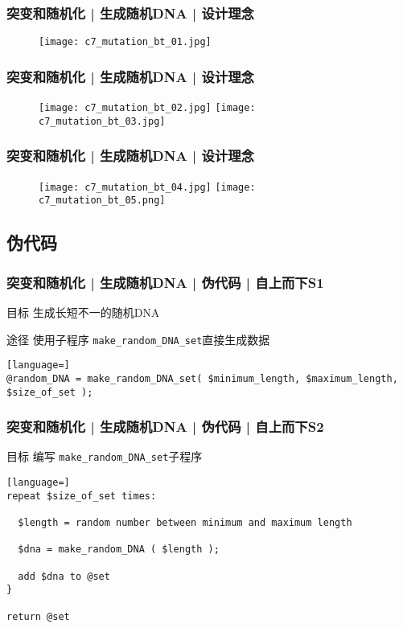 \begin{frame}
  \frametitle{突变和随机化 | 生成随机DNA | 设计理念}
  \begin{figure}
    \centering
    \texttt{[image: c7\_mutation\_bt\_01.jpg]}
  \end{figure}
\end{frame}

\begin{frame}
  \frametitle{突变和随机化 | 生成随机DNA | 设计理念}
  \begin{figure}
    \centering
    \texttt{[image: c7\_mutation\_bt\_02.jpg]}
    \texttt{[image: c7\_mutation\_bt\_03.jpg]}
  \end{figure}
\end{frame}

\begin{frame}
  \frametitle{突变和随机化 | 生成随机DNA | 设计理念}
  \begin{figure}
    \centering
    \texttt{[image: c7\_mutation\_bt\_04.jpg]}
    \texttt{[image: c7\_mutation\_bt\_05.png]}
  \end{figure}
\end{frame}

\subsection{伪代码}
\begin{frame}[fragile]
  \frametitle{突变和随机化 | 生成随机DNA | 伪代码 | 自上而下S1}
  \begin{block}{目标}
    生成长短不一的随机DNA
  \end{block}
  \pause
  \begin{block}{途径}
  使用子程序 \verb|make_random_DNA_set|直接生成数据
  \end{block}
  \pause
\begin{lstlisting}[language=]
@random_DNA = make_random_DNA_set( $minimum_length, $maximum_length, $size_of_set );
\end{lstlisting}
\end{frame}

\begin{frame}[fragile]
  \frametitle{突变和随机化 | 生成随机DNA | 伪代码 | 自上而下S2}
  \begin{block}{目标}
    编写 \verb|make_random_DNA_set|子程序
  \end{block}
  \pause
\begin{lstlisting}[language=]
repeat $size_of_set times:

  $length = random number between minimum and maximum length

  $dna = make_random_DNA ( $length );

  add $dna to @set
}

return @set
\end{lstlisting}
\end{frame}

